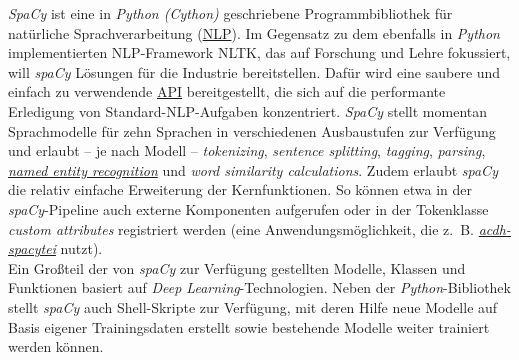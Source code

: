 \documentclass{article}
\begin{document}
    \emph{SpaCy} ist eine in \emph{Python (Cython)} geschriebene Programmbibliothek für natürliche Sprachverarbeitung (\href{http://gams.uni-graz.at/o:konde.145}{NLP}). Im Gegensatz zu dem ebenfalls in \emph{Python} implementierten NLP-Framework NLTK, das auf Forschung und Lehre fokussiert, will \emph{spaCy} Lösungen für die Industrie bereitstellen. Dafür wird eine saubere und einfach zu verwendende \href{http://gams.uni-graz.at/o:konde.31}{API} bereitgestellt, die sich auf die performante Erledigung von Standard-NLP-Aufgaben konzentriert. \emph{SpaCy} stellt momentan Sprachmodelle für zehn Sprachen in verschiedenen Ausbaustufen zur Verfügung und erlaubt – je nach Modell – \emph{tokenizing}, \emph{sentence splitting}, \emph{tagging}, \emph{parsing}, \emph{\href{http://gams.uni-graz.at/o:konde.141}{named entity recognition}} und \emph{word similarity calculations}. Zudem erlaubt \emph{spaCy} die relativ einfache Erweiterung der Kernfunktionen. So können etwa in der \emph{spaCy}-Pipeline auch externe Komponenten aufgerufen oder in der Tokenklasse \emph{custom attributes} registriert werden (eine Anwendungsmöglichkeit, die z. B. \emph{\href{http://gams.uni-graz.at/o:konde.2}{acdh-spacytei}} nutzt).\\
            
        Ein Großteil der von \emph{spaCy} zur Verfügung gestellten Modelle, Klassen und Funktionen basiert auf \emph{Deep Learning}-Technologien. Neben der \emph{Python}-Bibliothek stellt \emph{spaCy} auch Shell-Skripte zur Verfügung, mit deren Hilfe neue Modelle auf Basis eigener Trainingsdaten erstellt sowie bestehende Modelle weiter trainiert werden können.\\
            
\end{document}
